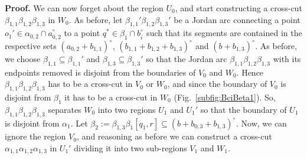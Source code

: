 \documentclass{article}
\newcommand{\ti}[2][]{{#2}^{\circ_{#1}}}
\newcommand{\qedsymbol}{\ding{113}}
\newenvironment{proof}{\par\noindent\textbf{Proof.}}{\mbox{}\hfill\qedsymbol\par\bigskip}
\begin{document}
\begin{proof}
 We can now forget about the region $U_0$, and start constructing a cross-cut 
 $\beta_{1,1}\beta_{1,2}\beta_{1,3}$ in $W_0$. As before, let $\beta_{1,1}'\beta_{1,2}\beta_{1,3}'$
 be a Jordan arc connecting a point $o_1'\in\alpha_{0,2}\cap\ti a_{0,2}$ to a point 
 $q^*\in\beta_1\cap\ti b_i$ such that its segments are contained in the respective sets 
 $\ti{(a_{0,2}+b_{1,1})}$, $\ti{(b_{1,1}+b_{1,2}+b_{1,3})}$ and $\ti{(b+b_{1,3})}$. As before, we choose 
 $\beta_{1,1}\subseteq \beta_{1,1}'$ and $\beta_{1,3}\subseteq \beta_{1,3}'$ so that the Jordan arc
 $\beta_{1,1}\beta_{1,2}\beta_{1,3}$ with its endpoints removed is disjoint from the boundaries of 
 $V_0$ and $W_0$. Hence $\beta_{1,1}\beta_{1,2}\beta_{1,3}$ has to be a cross-cut in $V_0$ or 
 $W_0$,  and since the boundary of $V_0$ is disjoint from $\beta_1$ it has to be a cross-cut in  
 $W_0$  (Fig.~\ref{subfig:BciBeta1}). So, $\beta_{1,1}\beta_{1,2}\beta_{1,3}$ separates $W_0$ 
 into two regions $U_1$ and $U_1'$ so that the boundary of $U_1$ is disjoint from $\alpha_1$.
 Let $\beta_2:=\beta_{1,3}\beta_1[q_1,r]\subseteq \ti{(b+b_{0,3}+b_{1,3})}$. Now, we can ignore 
 the region $V_0$, and reasoning as before we can construct a cross-cut 
 $\alpha_{1,1}\alpha_{1,2}\alpha_{1,3}$ in $U_1'$ dividing it into two sub-regions $V_1$ and $W_1$. 
\begin{figure}[h]
\end{figure}
\end{proof}
\end{document}
